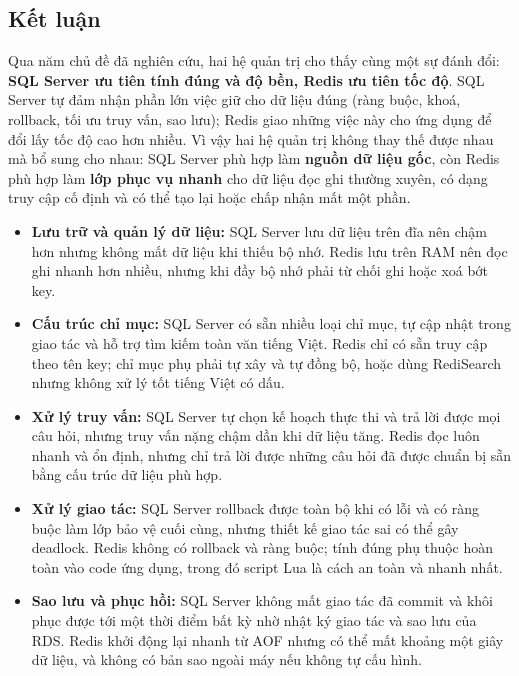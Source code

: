 \subsection{Kết luận}
\label{subsec:topics-summary}

Qua năm chủ đề đã nghiên cứu, hai hệ quản trị cho thấy cùng một sự đánh đổi: \textbf{SQL Server ưu tiên tính đúng và độ bền, Redis ưu tiên tốc độ}. SQL Server tự đảm nhận phần lớn việc giữ cho dữ liệu đúng (ràng buộc, khoá, rollback, tối ưu truy vấn, sao lưu); Redis giao những việc này cho ứng dụng để đổi lấy tốc độ cao hơn nhiều. Vì vậy hai hệ quản trị không thay thế được nhau mà bổ sung cho nhau: SQL Server phù hợp làm \textbf{nguồn dữ liệu gốc}, còn Redis phù hợp làm \textbf{lớp phục vụ nhanh} cho dữ liệu đọc ghi thường xuyên, có dạng truy cập cố định và có thể tạo lại hoặc chấp nhận mất một phần.

\begin{itemize}
    \item \textbf{Lưu trữ và quản lý dữ liệu:} SQL Server lưu dữ liệu trên đĩa nên chậm hơn nhưng không mất dữ liệu khi thiếu bộ nhớ. Redis lưu trên RAM nên đọc ghi nhanh hơn nhiều, nhưng khi đầy bộ nhớ phải từ chối ghi hoặc xoá bớt key.
    \item \textbf{Cấu trúc chỉ mục:} SQL Server có sẵn nhiều loại chỉ mục, tự cập nhật trong giao tác và hỗ trợ tìm kiếm toàn văn tiếng Việt. Redis chỉ có sẵn truy cập theo tên key; chỉ mục phụ phải tự xây và tự đồng bộ, hoặc dùng RediSearch nhưng không xử lý tốt tiếng Việt có dấu.
    \item \textbf{Xử lý truy vấn:} SQL Server tự chọn kế hoạch thực thi và trả lời được mọi câu hỏi, nhưng truy vấn nặng chậm dần khi dữ liệu tăng. Redis đọc luôn nhanh và ổn định, nhưng chỉ trả lời được những câu hỏi đã được chuẩn bị sẵn bằng cấu trúc dữ liệu phù hợp.
    \item \textbf{Xử lý giao tác:} SQL Server rollback được toàn bộ khi có lỗi và có ràng buộc làm lớp bảo vệ cuối cùng, nhưng thiết kế giao tác sai có thể gây deadlock. Redis không có rollback và ràng buộc; tính đúng phụ thuộc hoàn toàn vào code ứng dụng, trong đó script Lua là cách an toàn và nhanh nhất.
    \item \textbf{Sao lưu và phục hồi:} SQL Server không mất giao tác đã commit và khôi phục được tới một thời điểm bất kỳ nhờ nhật ký giao tác và sao lưu của RDS. Redis khởi động lại nhanh từ AOF nhưng có thể mất khoảng một giây dữ liệu, và không có bản sao ngoài máy nếu không tự cấu hình.
\end{itemize}

